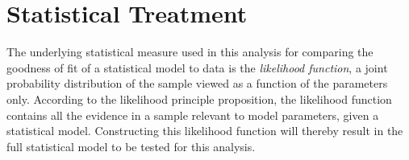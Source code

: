 \chapter[Statistical Treatment][Statistical Treatment]{Statistical Treatment}
\label{app:statisticaltreatment}

The underlying statistical measure used in this analysis for comparing the goodness of fit of a statistical model to data is the \emph{likelihood function}, a joint probability distribution of the sample viewed as a function of the parameters only.
According to the likelihood principle proposition, the likelihood function contains all the evidence in a sample relevant to model parameters, given a statistical model.
Constructing this likelihood function will thereby result in the full statistical model to be tested for this analysis.

